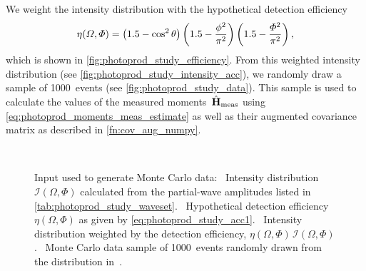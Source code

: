 We weight the intensity distribution with the hypothetical detection
efficiency
\begin{equation}
  \label{eq:photoprod_study_acc1}
  \eta(\Omega, \Phi)
  = \rBrk[1]{1.5 - \cos^2 \theta} \rBrk[3]{1.5 - \frac{\phi^2}{\pi^2}} \rBrk[3]{1.5 - \frac{\Phi^2}{\pi^2}},
\end{equation}
which is shown in \cref{fig:photoprod_study_efficiency}.  From this
weighted intensity distribution (see
\cref{fig:photoprod_study_intensity_acc}), we randomly draw a sample
of \num{1000}~events (see \cref{fig:photoprod_study_data}).  This
sample is used to calculate the values of the measured
moments~$\hat{\bm{\mathrm{H}}}_\text{meas}$ using
\cref{eq:photoprod_moments_meas_estimate} as well as their augmented
covariance matrix as described in \cref{fn:cov_aug_numpy}.

\begin{figure}[tbp]
  \centering%
  \\%
  \caption{Input used to generate Monte Carlo data:
  ~Intensity distribution
  $\mathcal{I}(\Omega, \Phi)$ calculated from the partial-wave
  amplitudes listed in \cref{tab:photoprod_study_waveset}.
  ~Hypothetical
  detection efficiency $\eta(\Omega, \Phi)$ as given by
  \cref{eq:photoprod_study_acc1}.
  ~Intensity
  distribution weighted by the detection efficiency, \ie $\eta(\Omega,
  \Phi)\, \mathcal{I}(\Omega, \Phi)$.
  ~Monte Carlo data sample of
  \num{1000}~events randomly drawn from the distribution
  in~.}%
  \label{fig:photoprod_study_input}%
\end{figure}

